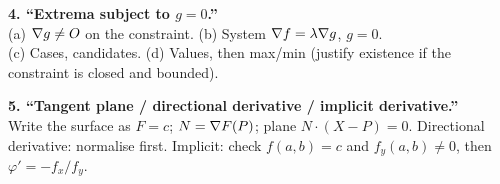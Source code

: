 \begin{method}
\textbf{4. ``Extrema subject to $g=0$.''}\\
(a) $\nabla g\ne O$ on the constraint. (b) System $\nabla f=\lambda\nabla g$, $g=0$.\\
(c) Cases, candidates. (d) Values, then max/min (justify existence if the constraint is closed and bounded).
\end{method}

\begin{method}
\textbf{5. ``Tangent plane / directional derivative / implicit derivative.''}\\
Write the surface as $F=c$; $N=\nabla F(P)$; plane $N\cdot(X-P)=0$. Directional derivative: normalise
first. Implicit: check $f(a,b)=c$ and $f_y(a,b)\ne0$, then $\varphi'=-f_x/f_y$.
\end{method}
